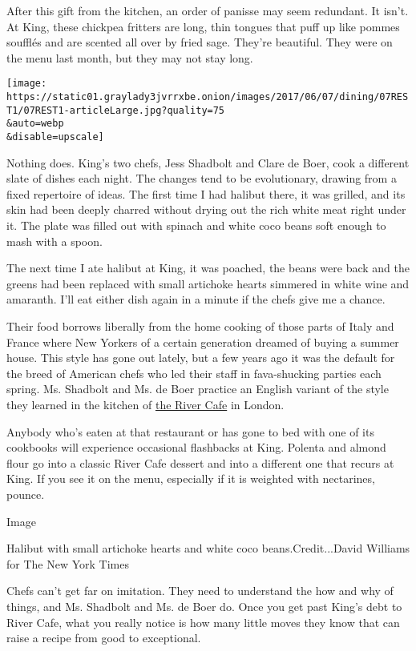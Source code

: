 After this gift from the kitchen, an order of panisse may seem
redundant. It isn't. At King, these chickpea fritters are long, thin
tongues that puff up like pommes soufflés and are scented all over by
fried sage. They're beautiful. They were on the menu last month, but
they may not stay long.

\texttt{[image: https://static01.graylady3jvrrxbe.onion/images/2017/06/07/dining/07REST1/07REST1-articleLarge.jpg?quality=75\\\&auto=webp\\\&disable=upscale]}

Nothing does. King's two chefs, Jess Shadbolt and Clare de Boer, cook a
different slate of dishes each night. The changes tend to be
evolutionary, drawing from a fixed repertoire of ideas. The first time I
had halibut there, it was grilled, and its skin had been deeply charred
without drying out the rich white meat right under it. The plate was
filled out with spinach and white coco beans soft enough to mash with a
spoon.

The next time I ate halibut at King, it was poached, the beans were back
and the greens had been replaced with small artichoke hearts simmered in
white wine and amaranth. I'll eat either dish again in a minute if the
chefs give me a chance.

Their food borrows liberally from the home cooking of those parts of
Italy and France where New Yorkers of a certain generation dreamed of
buying a summer house. This style has gone out lately, but a few years
ago it was the default for the breed of American chefs who led their
staff in fava-shucking parties each spring. Ms. Shadbolt and Ms. de Boer
practice an English variant of the style they learned in the kitchen of
\href{http://www.rivercafe.co.uk/}{the River Cafe} in London.

Anybody who's eaten at that restaurant or has gone to bed with one of
its cookbooks will experience occasional flashbacks at King. Polenta and
almond flour go into a classic River Cafe dessert and into a different
one that recurs at King. If you see it on the menu, especially if it is
weighted with nectarines, pounce.

Image

Halibut with small artichoke hearts and white coco beans.Credit...David
Williams for The New York Times

Chefs can't get far on imitation. They need to understand the how and
why of things, and Ms. Shadbolt and Ms. de Boer do. Once you get past
King's debt to River Cafe, what you really notice is how many little
moves they know that can raise a recipe from good to exceptional.

